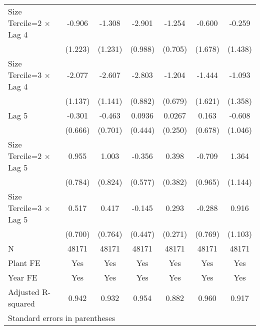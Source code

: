 \begin{table}[htbp]
\begin{tabular}{l*{6}{c}}
\addlinespace
Size Tercile=2 $\times$ Lag 4&   -0.906         &   -1.308         &   -2.901\sym{**} &   -1.254         &   -0.600         &   -0.259         \\
                &  (1.223)         &  (1.231)         &  (0.988)         &  (0.705)         &  (1.678)         &  (1.438)         \\
\addlinespace
Size Tercile=3 $\times$ Lag 4&   -2.077         &   -2.607\sym{*}  &   -2.803\sym{**} &   -1.204         &   -1.444         &   -1.093         \\
                &  (1.137)         &  (1.141)         &  (0.882)         &  (0.679)         &  (1.621)         &  (1.358)         \\
\addlinespace
Lag 5           &   -0.301         &   -0.463         &   0.0936         &   0.0267         &    0.163         &   -0.608         \\
                &  (0.666)         &  (0.701)         &  (0.444)         &  (0.250)         &  (0.678)         &  (1.046)         \\
\addlinespace
Size Tercile=2 $\times$ Lag 5&    0.955         &    1.003         &   -0.356         &    0.398         &   -0.709         &    1.364         \\
                &  (0.784)         &  (0.824)         &  (0.577)         &  (0.382)         &  (0.965)         &  (1.144)         \\
\addlinespace
Size Tercile=3 $\times$ Lag 5&    0.517         &    0.417         &   -0.145         &    0.293         &   -0.288         &    0.916         \\
                &  (0.700)         &  (0.764)         &  (0.447)         &  (0.271)         &  (0.769)         &  (1.103)         \\
\midrule
N               &    48171         &    48171         &    48171         &    48171         &    48171         &    48171         \\
Plant FE        &      Yes         &      Yes         &      Yes         &      Yes         &      Yes         &      Yes         \\
Year FE         &      Yes         &      Yes         &      Yes         &      Yes         &      Yes         &      Yes         \\
Adjusted R-squared&    0.942         &    0.932         &    0.954         &    0.882         &    0.960         &    0.917         \\
\bottomrule
\multicolumn{7}{l}{\footnotesize Standard errors in parentheses}\\

\end{tabular}
\end{table}
